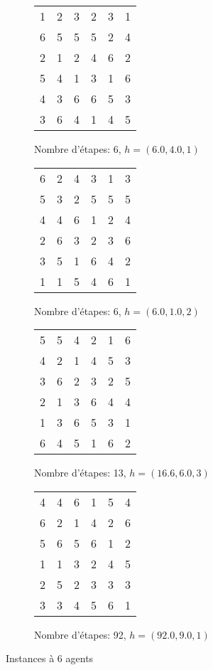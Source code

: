 \documentclass[a4paper, 10pt]{article}
\newcommand{\bb}[1]{\colorbox{blue!30}{#1}}
\begin{document}
\begin{figure}[h]
\centering
\begin{subfigure}[h]{0.45\textwidth}
	\centering
	\begin{tabular}{|c c c c c c|}
		\hline
		\bb{1} & \bb{2} & \bb{3} & 2 & 3 & 1 \\
		6 & 5 & 5 & \bb{5} & 2 & \bb{4} \\
		2 & 1 & 2 & 4 & \bb{6} & 2 \\
		5 & 4 & 1 & 3 & 1 & 6 \\
		4 & 3 & 6 & 6 & 5 & 3 \\
		3 & 6 & 4 & 1 & 4 & 5 \\
		\hline
	\end{tabular}
	\caption{Nombre d'étapes: 6, $h = (6.0, 4.0, 1)$}
\end{subfigure}
\begin{subfigure}[h]{0.45\textwidth}
	\centering
	\begin{tabular}{|c c c c c c|}
		\hline
		\bb{6} & \bb{2} & \bb{4} & \bb{3} & \bb{1} & 3 \\
		5 & 3 & 2 & 5 & 5 & \bb{5} \\
		4 & 4 & 6 & 1 & 2 & 4 \\
		2 & 6 & 3 & 2 & 3 & 6 \\
		3 & 5 & 1 & 6 & 4 & 2 \\
		1 & 1 & 5 & 4 & 6 & 1 \\
		\hline
	\end{tabular}
	\caption{Nombre d'étapes: 6, $h = (6.0, 1.0, 2)$}
\end{subfigure}
\begin{subfigure}[h]{0.45\textwidth}
	\centering
	\begin{tabular}{|c c c c c c|}
		\hline
		5 & 5 & 4 & 2 & 1 & \bb{6} \\
		\bb{4} & \bb{2} & \bb{1} & 4 & \bb{5} & 3 \\
		3 & 6 & 2 & \bb{3} & 2 & 5 \\
		2 & 1 & 3 & 6 & 4 & 4 \\
		1 & 3 & 6 & 5 & 3 & 1 \\
		6 & 4 & 5 & 1 & 6 & 2 \\
		\hline
	\end{tabular}
	\caption{Nombre d'étapes: 13, $h = (16.6, 6.0, 3)$}
\end{subfigure}
\begin{subfigure}[h]{0.45\textwidth}
	\centering
	\begin{tabular}{|c c c c c c|}
		\hline
		4 & 4 & 6 & 1 & \bb{5} & 4 \\
		6 & \bb{2} & 1 & \bb{4} & 2 & \bb{6} \\
		5 & 6 & 5 & 6 & 1 & 2 \\
		\bb{1} & 1 & \bb{3} & 2 & 4 & 5 \\
		2 & 5 & 2 & 3 & 3 & 3 \\
		3 & 3 & 4 & 5 & 6 & 1 \\
		\hline
	\end{tabular}
	\caption{Nombre d'étapes: 92, $h = (92.0, 9.0, 1)$}
\end{subfigure}
\caption{Instances à 6 agents}
\end{figure}
\end{document}

